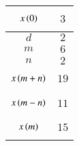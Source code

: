 \begin{tabular}{|p{4.5cm}|p{4.5cm}|}
    \hline
      $$x\left(0\right)$$ & $$3$$  \\ \hline
      $$d$$ & $$2$$  \\ \hline
      $$m$$ & $$6$$  \\ \hline
      $$n$$ & $$2$$  \\ \hline
      $$x\left(m+n\right)$$ & $$19$$  \\ \hline
      $$x\left(m-n\right)$$ & $$11$$  \\ \hline
      $$x\left(m\right)$$ & $$15$$  \\ \hline
    \end{tabular}
